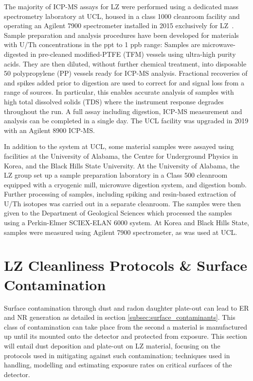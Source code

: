 The majority of ICP-MS assays for LZ were performed using a dedicated mass spectrometry laboratory at UCL, housed in a class 1000 cleanroom facility and operating an Agilent 7900 spectrometer installed in 2015 exclusively for LZ~\cite{icpms_ucl}. Sample preparation and analysis procedures have been developed for materials with U/Th concentrations in the ppt to 1 ppb range: Samples are microwave-digested in pre-cleaned modified-PTFE (TFM) vessels using ultra-high purity acids. They are then diluted, without further chemical treatment, into disposable 50 \milli{}\litre{} polypropylene (PP) vessels ready for ICP-MS analysis. Fractional recoveries of \thtTz{} and \utTT{} spikes added prior to digestion are used to correct for \thtTt{} and \utTe{} signal loss from a range of sources. In particular, this enables accurate analysis of samples with high total dissolved solids (TDS) where the instrument response degrades throughout the run. A full assay including digestion, ICP-MS measurement and analysis can be completed in a single day. The UCL facility was upgraded in 2019 with an Agilent 8900 ICP-MS. 

In addition to the system at UCL, some material samples were assayed using facilities at the University of Alabama, the  Centre for Underground Physics in Korea, and the Black Hills State University.  At the University of Alabama, the LZ group set up a sample preparation laboratory in a Class 500 cleanroom equipped with a cryogenic mill, microwave digestion system, and digestion bomb.  Further processing of samples, including spiking and resin-based extraction of U/Th isotopes was carried out in a separate cleanroom.  The samples were then given to the Department of Geological Sciences which processed the samples using a Perkin-Elmer SCIEX-ELAN 6000 system.  At Korea and Black Hills State, samples were measured using Agilent 7900 spectrometer, as was used at UCL.


\section{LZ Cleanliness Protocols \& Surface Contamination}
\label{sec:cleanliness}

Surface contamination through dust and radon daughter plate-out can lead to ER and NR generation as detailed in section \ref{subsec:surface_contaminants}. This class of contamination can take place from the second a material is manufactured up until its mounted onto the detector and protected from exposure. This section will entail dust deposition and plate-out on LZ material, focusing on the protocols used in mitigating against such contamination; techniques used in handling, modelling and estimating exposure rates on critical surfaces of the detector.


